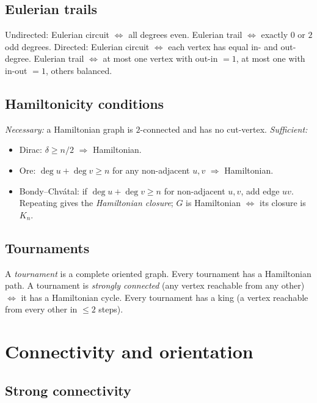 \subsection{Eulerian trails}
\label{subsec:eulerian}

Undirected: Eulerian circuit $\iff$ all degrees even. Eulerian trail $\iff$ exactly $0$ or $2$ odd degrees.
Directed: Eulerian circuit $\iff$ each vertex has equal in- and out-degree. Eulerian trail $\iff$ at most one vertex with out-in $=1$, at most one with in-out $=1$, others balanced.

\subsection{Hamiltonicity conditions}
\label{subsec:hamiltonicity}

\textit{Necessary:} a Hamiltonian graph is $2$-connected and has no cut-vertex.
\textit{Sufficient:}
\begin{itemize}
\item Dirac: $\delta\ge n/2$ $\Rightarrow$ Hamiltonian.
\item Ore: $\deg u+\deg v\ge n$ for any non-adjacent $u,v$ $\Rightarrow$ Hamiltonian.
\item Bondy--Chv\'atal: if $\deg u+\deg v\ge n$ for non-adjacent $u,v$, add edge $uv$. Repeating gives the \textit{Hamiltonian closure}; $G$ is Hamiltonian $\iff$ its closure is $K_n$.
\end{itemize}

\subsection{Tournaments}
\label{subsec:tournaments}

A \textit{tournament} is a complete oriented graph. Every tournament has a Hamiltonian path. A tournament is \textit{strongly connected} (any vertex reachable from any other) $\iff$ it has a Hamiltonian cycle. Every tournament has a king (a vertex reachable from every other in $\le2$ steps).

\medskip

\section{Connectivity and orientation}
\label{sec:connectivity}

\subsection{Strong connectivity}
\label{subsec:strong-connectivity}

